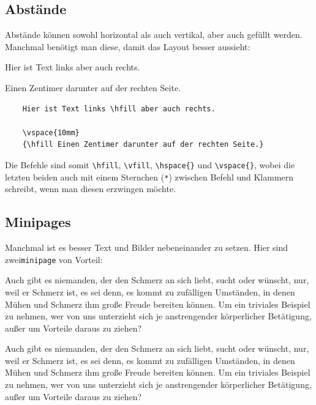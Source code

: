 \subsection{Abstände}

Abstände können sowohl horizontal als auch vertikal, aber auch gefüllt werden. Manchmal benötigt man diese, damit das Layout besser aussieht:

Hier ist Text links \hfill aber auch rechts.

\vspace{10mm}
{\hfill Einen Zentimer darunter auf der rechten Seite.}

\begin{verbatim}
    Hier ist Text links \hfill aber auch rechts.

    \vspace{10mm}
    {\hfill Einen Zentimer darunter auf der rechten Seite.}
\end{verbatim}

Die Befehle sind somit \verb|\hfill|, \verb|\vfill|, \verb|\hspace{}| und \verb|\vspace{}|, wobei die letzten beiden auch mit einem Sternchen (\verb|*|) zwischen Befehl und Klammern schreibt, wenn man diesen erzwingen möchte.


\subsection{Minipages}

Manchmal ist es besser Text und Bilder nebeneinander zu setzen. Hier sind zwei\linebreak \verb|minipage| von Vorteil:\\

\begin{minipage}[H]{0.48\textwidth}
	Auch gibt es niemanden, der den Schmerz an sich liebt, sucht oder wünscht, nur, weil er Schmerz ist, es sei denn, es kommt zu zufälligen Umständen, in denen Mühen und Schmerz ihm große Freude bereiten können. Um ein triviales Beispiel zu nehmen, wer von uns unterzieht sich je anstrengender körperlicher Betätigung, außer um Vorteile daraus zu ziehen?
\end{minipage}
\hfill
\begin{minipage}[H]{0.48\textwidth}
	Auch gibt es niemanden, der den Schmerz an sich liebt, sucht oder wünscht, nur, weil er Schmerz ist, es sei denn, es kommt zu zufälligen Umständen, in denen Mühen und Schmerz ihm große Freude bereiten können. Um ein triviales Beispiel zu nehmen, wer von uns unterzieht sich je anstrengender körperlicher Betätigung, außer um Vorteile daraus zu ziehen?
\end{minipage}\\

